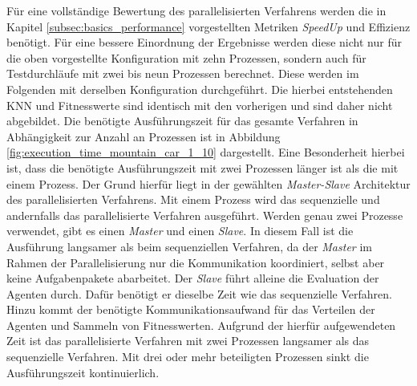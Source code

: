 Für eine vollständige Bewertung des parallelisierten Verfahrens werden die in Kapitel \ref{subsec:basics_performance} vorgestellten Metriken \emph{SpeedUp} und Effizienz benötigt. Für eine bessere Einordnung der Ergebnisse werden diese nicht nur für die oben vorgestellte Konfiguration mit zehn Prozessen, sondern auch für Testdurchläufe mit zwei bis neun Prozessen berechnet. Diese werden im Folgenden mit derselben Konfiguration durchgeführt. Die hierbei entstehenden \ac{KNN} und Fitnesswerte sind identisch mit den vorherigen und sind daher nicht abgebildet. Die benötigte Ausführungszeit für das gesamte Verfahren in Abhängigkeit zur Anzahl an Prozessen ist in Abbildung \ref{fig:execution_time_mountain_car_1_10} dargestellt. Eine Besonderheit hierbei ist, dass die benötigte Ausführungszeit mit zwei Prozessen länger ist als die mit einem Prozess. Der Grund hierfür liegt in der gewählten \emph{Master-Slave} Architektur des parallelisierten Verfahrens. Mit einem Prozess wird das sequenzielle und andernfalls das parallelisierte Verfahren ausgeführt. Werden genau zwei Prozesse verwendet, gibt es einen \emph{Master} und einen \emph{Slave}. In diesem Fall ist die Ausführung langsamer als beim sequenziellen Verfahren, da der \emph{Master} im Rahmen der Parallelisierung nur die Kommunikation koordiniert, selbst aber keine Aufgabenpakete abarbeitet. Der \emph{Slave} führt alleine die Evaluation der Agenten durch. Dafür benötigt er dieselbe Zeit wie das sequenzielle Verfahren. Hinzu kommt der benötigte Kommunikationsaufwand für das Verteilen der Agenten und Sammeln von Fitnesswerten. Aufgrund der hierfür aufgewendeten Zeit ist das parallelisierte Verfahren mit zwei Prozessen langsamer als das sequenzielle Verfahren. Mit drei oder mehr beteiligten Prozessen sinkt die Ausführungszeit kontinuierlich. 
